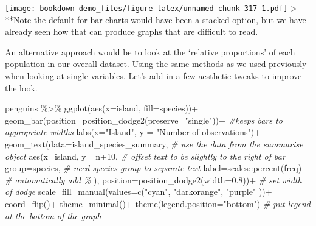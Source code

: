 \documentclass[
]{book}
\newenvironment{Shaded}{\begin{snugshade}}{\end{snugshade}}
\newcommand{\AttributeTok}[1]{\textcolor[rgb]{0.77,0.63,0.00}{#1}}
\newcommand{\CommentTok}[1]{\textcolor[rgb]{0.56,0.35,0.01}{\textit{#1}}}
\newcommand{\DecValTok}[1]{\textcolor[rgb]{0.00,0.00,0.81}{#1}}
\newcommand{\FloatTok}[1]{\textcolor[rgb]{0.00,0.00,0.81}{#1}}
\newcommand{\FunctionTok}[1]{\textcolor[rgb]{0.00,0.00,0.00}{#1}}
\newcommand{\NormalTok}[1]{#1}
\newcommand{\SpecialCharTok}[1]{\textcolor[rgb]{0.00,0.00,0.00}{#1}}
\newcommand{\StringTok}[1]{\textcolor[rgb]{0.31,0.60,0.02}{#1}}
\begin{document}
\texttt{[image: bookdown-demo\_files/figure-latex/unnamed-chunk-317-1.pdf]}
\textgreater{} **Note the default for bar charts would have been a stacked option, but we have already seen how that can produce graphs that are difficult to read.

An alternative approach would be to look at the `relative proportions' of each population in our overall dataset. Using the same methods as we used previously when looking at single variables. Let's add in a few aesthetic tweaks to improve the look.

\begin{Shaded}
\begin{Highlighting}[]
\NormalTok{penguins }\SpecialCharTok{\%\textgreater{}\%} 
  \FunctionTok{ggplot}\NormalTok{(}\FunctionTok{aes}\NormalTok{(}\AttributeTok{x=}\NormalTok{island, }\AttributeTok{fill=}\NormalTok{species))}\SpecialCharTok{+}
  \FunctionTok{geom\_bar}\NormalTok{(}\AttributeTok{position=}\FunctionTok{position\_dodge2}\NormalTok{(}\AttributeTok{preserve=}\StringTok{"single"}\NormalTok{))}\SpecialCharTok{+} 
  \CommentTok{\#keeps bars to appropriate widths}
    \FunctionTok{labs}\NormalTok{(}\AttributeTok{x=}\StringTok{"Island"}\NormalTok{,}
       \AttributeTok{y =} \StringTok{"Number of observations"}\NormalTok{)}\SpecialCharTok{+}
  \FunctionTok{geom\_text}\NormalTok{(}\AttributeTok{data=}\NormalTok{island\_species\_summary, }\CommentTok{\# use the data from the summarise object}
            \FunctionTok{aes}\NormalTok{(}\AttributeTok{x=}\NormalTok{island,}
                \AttributeTok{y=}\NormalTok{ n}\SpecialCharTok{+}\DecValTok{10}\NormalTok{, }\CommentTok{\# offset text to be slightly to the right of bar}
                \AttributeTok{group=}\NormalTok{species, }\CommentTok{\# need species group to separate text}
                \AttributeTok{label=}\NormalTok{scales}\SpecialCharTok{::}\FunctionTok{percent}\NormalTok{(freq) }\CommentTok{\# automatically add \%}
\NormalTok{                ),}
            \AttributeTok{position=}\FunctionTok{position\_dodge2}\NormalTok{(}\AttributeTok{width=}\FloatTok{0.8}\NormalTok{))}\SpecialCharTok{+} \CommentTok{\# set width of dodge}
  \FunctionTok{scale\_fill\_manual}\NormalTok{(}\AttributeTok{values=}\FunctionTok{c}\NormalTok{(}\StringTok{"cyan"}\NormalTok{,}
                            \StringTok{"darkorange"}\NormalTok{,}
                            \StringTok{"purple"}
\NormalTok{                            ))}\SpecialCharTok{+}
  \FunctionTok{coord\_flip}\NormalTok{()}\SpecialCharTok{+}
  \FunctionTok{theme\_minimal}\NormalTok{()}\SpecialCharTok{+}
  \FunctionTok{theme}\NormalTok{(}\AttributeTok{legend.position=}\StringTok{"bottom"}\NormalTok{) }\CommentTok{\# put legend at the bottom of the graph}
\end{Highlighting}
\end{Shaded}
\end{document}

